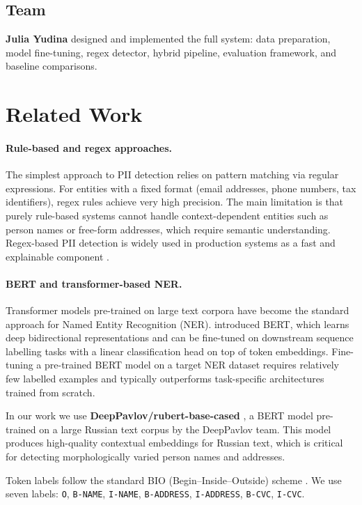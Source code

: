 \documentclass{article}
\begin{document}
\subsection{Team}

\textbf{Julia Yudina} designed and implemented the full system: data preparation, model fine-tuning, regex detector, hybrid pipeline, evaluation framework, and baseline comparisons.

\section{Related Work}
\label{sec:related}

\paragraph{Rule-based and regex approaches.}
The simplest approach to PII detection relies on pattern matching via regular expressions. For entities with a fixed format (email addresses, phone numbers, tax identifiers), regex rules achieve very high precision. The main limitation is that purely rule-based systems cannot handle context-dependent entities such as person names or free-form addresses, which require semantic understanding. Regex-based PII detection is widely used in production systems as a fast and explainable component \cite{lison2021anonymisation}.

\paragraph{BERT and transformer-based NER.}
Transformer models pre-trained on large text corpora have become the standard approach for Named Entity Recognition (NER). \citet{devlin2019bert} introduced BERT, which learns deep bidirectional representations and can be fine-tuned on downstream sequence labelling tasks with a linear classification head on top of token embeddings. Fine-tuning a pre-trained BERT model on a target NER dataset requires relatively few labelled examples and typically outperforms task-specific architectures trained from scratch.

In our work we use \textbf{DeepPavlov/rubert-base-cased} \cite{kuratov2019adaptation}, a BERT model pre-trained on a large Russian text corpus by the DeepPavlov team. This model produces high-quality contextual embeddings for Russian text, which is critical for detecting morphologically varied person names and addresses.

Token labels follow the standard BIO (Begin--Inside--Outside) scheme \cite{ramshaw1995text}. We use seven labels: \texttt{O}, \texttt{B-NAME}, \texttt{I-NAME}, \texttt{B-ADDRESS}, \texttt{I-ADDRESS}, \texttt{B-CVC}, \texttt{I-CVC}.
\end{document}
